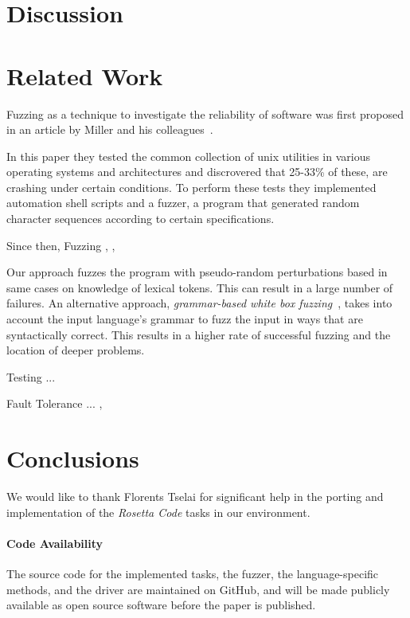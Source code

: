 \documentclass[10pt]{sigplanconf}
\begin{document}
\section{Discussion} %
\label{sec:discussion}

\section{Related Work} %
\label{sec:related}

Fuzzing as a technique to investigate the reliability of software
was first proposed in an article by Miller and his colleagues~\cite{MFS90}.

In this paper they tested the common collection of {\sc unix}
utilities in various operating systems and architectures and discrovered that
25-33\% of these, are crashing under certain conditions. To perform these tests
they implemented automation shell scripts and a fuzzer, a program that generated
random character sequences according to certain specifications.

Since then, Fuzzing \cite{TJC08}, \cite{WWGZ11} , \cite{GLRI09}

Our approach fuzzes the program with pseudo-random
perturbations based in same cases on knowledge of
lexical tokens.
This can result in a large number of failures.
An alternative approach, {\em grammar-based white box fuzzing}~\cite{God08},
takes into account the input language's grammar to fuzz the input in
ways that are syntactically correct.
This results in a higher rate of successful fuzzing and the location
of deeper problems.

Testing ... \cite{HAM06}

Fault Tolerance ... \cite{KOKR07}, \cite{LYU95}

\section{Conclusions} %
\label{sec:conclusions}


\acks

We would like to thank Florents Tselai for significant
help in the porting and implementation of the
{\em Rosetta Code} tasks in our environment.


\paragraph{Code Availability} The source code for
the implemented tasks,
the fuzzer,
the language-specific methods, and
the driver are maintained on GitHub, and
will be made publicly available as open source software
before the paper is published.








\end{document}
